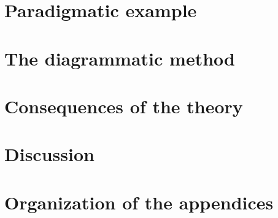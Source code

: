     \section{Paradigmatic example}\label{sect:entropic-example}
        
      
    \section{The diagrammatic method}\label{sect:calculus}
        

    \section{Consequences of the theory}\label{sect:consequences}
        
       
    \section{Discussion}
        

    
    
    
    \appendix

    \newpage
    \section*{Organization of the appendices}
        

